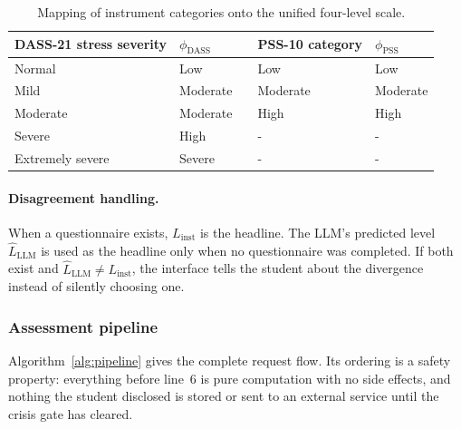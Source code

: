 \begin{table}[ht]
	\centering
	\caption{Mapping of instrument categories onto the unified four-level scale.}
	\label{tab:mapping}
	\begin{tabular}{llcll}
		\toprule
		DASS-21 stress severity & $\phi_{\text{DASS}}$ & & PSS-10 category & $\phi_{\text{PSS}}$ \\ \midrule
		Normal                  & Low                  & & Low             & Low                 \\
		Mild                    & Moderate             & & Moderate        & Moderate            \\
		Moderate                & Moderate             & & High            & High                \\
		Severe                  & High                 & & -             & -                 \\
		Extremely severe        & Severe               & & -             & -                 \\ \bottomrule
	\end{tabular}
\end{table}

\paragraph{Disagreement handling.} When a questionnaire exists, $L_{\text{inst}}$ is the headline. The LLM's predicted level $\hat{L}_{\text{LLM}}$ is used as the headline only when no questionnaire was completed. If both exist and $\hat{L}_{\text{LLM}}\neq L_{\text{inst}}$, the interface tells the student about the divergence instead of silently choosing one.

\subsubsection{Assessment pipeline}
Algorithm~\ref{alg:pipeline} gives the complete request flow. Its ordering is a safety property: everything before line~6 is pure computation with no side effects, and nothing the student disclosed is stored or sent to an external service until the crisis gate has cleared.

